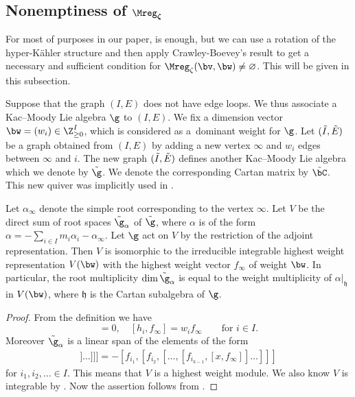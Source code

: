 \subsection[Nonemptiness of ${\mathfrak M}^{\rm s}_\zeta$]{Nonemptiness of $\boldsymbol{\Mreg_\zeta}$}\label{subsec:CB}

For most of purposes in our paper,  is enough, but
we can use a rotation of the hyper-K\"ahler structure and then apply
Crawley-Boevey's result \cite{CB} to get a necessary and suf\/f\/icient
condition for $\Mreg_\zeta(\bv,\bw)\neq\varnothing$. This will be given
in this subsection.

Suppose that the graph $(I,E)$ does not have edge loops. We thus
associate a Kac--Moody Lie algebra $\g$ to $(I,E)$.
%
We f\/ix a dimension vector $\bw = (w_i)\in \Z_{\ge 0}^I$, which is
considered as a~dominant weight for $\g$.
%
Let $(\Tilde{I}, \Tilde{E})$ be a graph obtained from $(I,E)$ by
adding a new vertex $\infty$ and $w_i$ edges between $\infty$ and $i$.
%
The new graph $(\Tilde{I}, \Tilde{E})$ def\/ines another Kac--Moody Lie
algebra which we denote by $\Tilde{\g}$. We denote the corresponding
Cartan matrix by $\Tilde{\bC}$. This new quiver was implicitly used in
.

\begin{Lemma}\label{lem:root}
  Let $\alpha_\infty$ denote the simple root corresponding to the
  vertex $\infty$. Let $V$ be the direct sum of root spaces
  $\Tilde{\g}_\alpha$ of $\Tilde{\g}$, where $\alpha$ is of the form
  $\alpha = - \sum_{i\in I} m_i \alpha_i - \alpha_\infty$. Let
  $\g$ act on $V$ by the restriction of the adjoint representation.
  Then $V$ is isomorphic to the irreducible integrable highest weight
  representation $V(\bw)$ with the highest weight vector $f_\infty$ of
  weight $\bw$. In particular, the root multiplicity $\dim
  \Tilde{\g}_\alpha$ is equal to the weight multiplicity of
  $\alpha|_{\mathfrak h}$ in $V(\bw)$, where $\mathfrak h$ is the
  Cartan subalgebra of $\g$.
\end{Lemma}

\begin{proof}
  From the def\/inition we have
  \begin{equation*}
    [e_i, f_\infty] = 0, \quad
    [h_i, f_\infty] = w_i f_\infty \qquad\text{for $i\in I$}.
  \end{equation*}
  Moreover $\Tilde{\g}_\alpha$ is a linear span of the elements of the
  form
\begin{gather*}
  [f_{i_1}, [f_{i_2}, [ \dots\!,  [f_{i_{k-1}}\!, [ f_\infty,
  \underbrace{[f_{i_k}, [\dots
  [ f_{i_{s-1}}\!, f_{i_s}]\dots]]}_{\ =x}]] \dots]]]
  = - [f_{i_1}, [f_{i_2}, [ \dots\!, [ f_{i_{k-1}}\!, [x, f_\infty]] \dots ]]]
\end{gather*}
for $i_1, i_2, \ldots\in I$. This means that $V$ is a highest
weight module.
%
We also know $V$ is integrable by \cite[3.5]{Kac}. Now the assertion
follows from \cite[10.4]{Kac}.
\end{proof}

